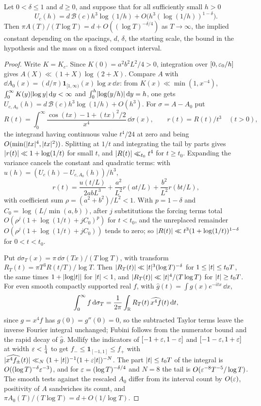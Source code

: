 \begin{theorem}\label{zer:thm:rate}
Let $0<\delta\le1$ and $d\ge0$, and suppose that for all sufficiently small $h>0$
\[
 U_c(h)=d\,\mathcal B(c)h^3\log(1/h)+O\bigl(h^3(\log(1/h))^{1-\delta}\bigr).
\]
Then $\pi A(T)/(T\log T)=d+O((\log T)^{-\delta/4})$ as $T\to\infty$, the implied constant depending on the
spacings, $d$, $\delta$, the starting scale, the bound in the hypothesis and the mass on a fixed compact
interval.
\end{theorem}

\begin{proof}
Write $K=K_c$. Since $K(0)=a^2b^2L^2/4>0$, integration over $[0,\varepsilon_0/h]$ gives $A(X)\ll(1+X)\log(2+X)$.
Compare $A$ with $\dd A_0(x)=(d/\pi)\mathbf 1_{[1,\infty)}(x)\log x\,\dd x$: from $K(x)\ll\min(1,x^{-4})$,
$\int_0^\infty K(y)\lvert\log y\rvert\,\mathrm{d} y<\infty$ and $\int_0^h\lvert\log(y/h)\rvert\,\mathrm{d} y=h$, one gets
$U_{c,A_0}(h)=d\,\mathcal B(c)h^3\log(1/h)+O(h^3)$. For $\sigma=A-A_0$ put
\[
 R(t)=\int_0^\infty\frac{\cos(tx)-1+(tx)^2/2}{x^4}\,\dd\sigma(x),\qquad r(t)=R(t)/t^3\quad(t>0),
\]
the integrand having continuous value $t^4/24$ at zero and being $O(\min(\lvert tx\rvert^4,\lvert tx\rvert^2))$. Splitting at
$1/t$ and integrating the tail by parts gives $\lvert r(t)\rvert\ll1+\log(1/t)$ for small $t$, and $\lvert R(t)\rvert\ll_{t_0}t^4$
for $t\ge t_0$. Expanding the variance cancels the constant and quadratic terms: with
$u(h)=(U_c(h)-U_{c,A_0}(h))/h^3$,
\[
 r(t)=\frac{u(t/L)}{2abL^3}+\frac{a^2}{L^2}r(at/L)+\frac{b^2}{L^2}r(bt/L),
\]
with coefficient sum $\rho=(a^2+b^2)/L^2<1$. With $p=1-\delta$ and $C_0=\log(L/\min(a,b))$, after $j$ substitutions
the forcing terms total $O(\rho^j(1+\log(1/t)+jC_0)^p)$ for $t<t_0$, and the unreplaced remainder
$O(\rho^j(1+\log(1/t)+jC_0))$ tends to zero; so $\lvert R(t)\rvert\ll t^3(1+\log(1/t))^{1-\delta}$ for $0<t<t_0$.

Put $\dd\sigma_T(x)=\pi\,\dd\sigma(Tx)/(T\log T)$, with transform $R_T(t)=\pi T^3R(t/T)/\log T$. Then
$\lvert R_T(t)\rvert\ll\lvert t\rvert^3(\log T)^{-\delta}$ for $1\le\lvert t\rvert\le t_0T$, the same times $1+\lvert\log\lvert t\rvert\rvert$ for
$\lvert t\rvert<1$, and $\lvert R_T(t)\rvert\ll\lvert t\rvert^4/(T\log T)$ for $\lvert t\rvert\ge t_0T$. For even smooth compactly supported real
$f$, with $\widehat g(t)=\int g(x)e^{-itx}\,\dd x$,
\[
 \int_0^\infty f\,\mathrm{d}\sigma_T=\frac1{2\pi}\int_{\mathbb{R}} R_T(t)\,\widehat{x^4f}(t)\,\mathrm{d} t,
\]
since $g=x^4f$ has $g(0)=g''(0)=0$, so the subtracted Taylor terms leave the inverse Fourier integral unchanged;
Fubini follows from the numerator bound and the rapid decay of $\widehat g$. Mollify the indicators of
$[-1+\varepsilon,1-\varepsilon]$ and $[-1-\varepsilon,1+\varepsilon]$ at width $\varepsilon<\tfrac14$ to get $f_-\le\mathbf 1_{[-1,1]}\le f_+$ with
$\lvert\widehat{x^4f_\pm}(t)\rvert\ll_N(1+\lvert t\rvert)^{-1}(1+\varepsilon\lvert t\rvert)^{-N}$. The part $\lvert t\rvert\le t_0T$ of the integral is
$O((\log T)^{-\delta}\varepsilon^{-3})$, and for $\varepsilon=(\log T)^{-\delta/4}$ and $N=8$ the tail is
$O(\varepsilon^{-8}T^{-5}/\log T)$. The smooth tests against the rescaled $A_0$ differ from its interval count by
$O(\varepsilon)$, positivity of $A$ sandwiches its count, and $\pi A_0(T)/(T\log T)=d+O(1/\log T)$.
\end{proof}

